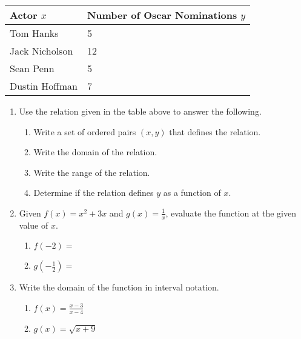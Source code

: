 


\begin{table}[h]
\begin{tabular}{|l|l|}
\hline
\textbf{Actor $x$} & \textbf{Number of Oscar Nominations $y$} \\ \hline
Tom Hanks          & 5                                        \\ \hline
Jack Nicholson     & 12                                       \\ \hline
Sean Penn          & 5                                        \\ \hline
Dustin Hoffman     & 7                                        \\ \hline
\end{tabular}
\end{table}



\begin{enumerate}
\item Use the relation given in the table above to answer the following.


\begin{enumerate}
\item Write a set of ordered pairs $(x,y)$ that defines the relation.\vfill
\item Write the domain of the relation.\vfill
\item Write the range of the relation.\vfill
\item Determine if the relation defines $y$ as a function of $x$.
\end{enumerate}
\vfill

\newpage
\item Given $f(x)=x^2+3x$ and $\displaystyle g(x)=\frac{1}{x}$, evaluate the function at the given value of $x$.
\begin{enumerate}
\item $f(-2)=$ \\[.5in]
\item $\displaystyle g(-\frac{1}{2})=$\\[.5in]
\end{enumerate}




\item Write the domain of the function in interval notation.
\begin{enumerate}
\item $\displaystyle f(x)=\frac{x-3}{x-4}$\vfill
\item $g(x)=\sqrt{x+9}$
\end{enumerate}
\vfill




\end{enumerate}




